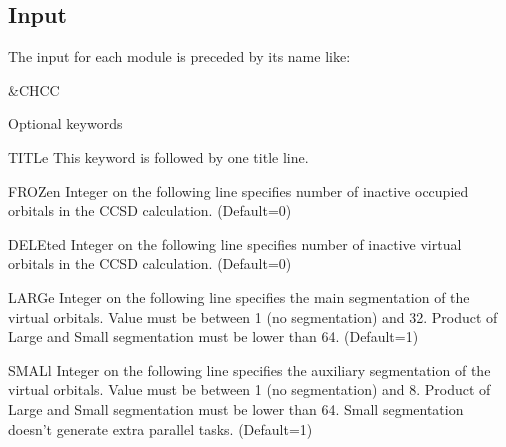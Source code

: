 \subsection{Input}
\label{sec:chcc_input}

The input for each module is preceded by its name like:
\begin{inputlisting}
 &CHCC
\end{inputlisting}
Optional keywords
\begin{keywordlist}
\item[TITLe]
This keyword is followed by one title line.
\item[FROZen]
Integer on the following line specifies number of inactive occupied
orbitals in the CCSD calculation. (Default=0)
\item[DELEted]
Integer on the following line specifies number of inactive virtual
orbitals in the CCSD calculation. (Default=0)
\item[LARGe]
Integer on the following line specifies the main segmentation of the virtual orbitals.
Value must be between 1 (no segmentation) and 32. Product of Large and Small segmentation
must be lower than 64. (Default=1)
\item[SMALl]
Integer on the following line specifies the auxiliary segmentation of the virtual orbitals.
Value must be between 1 (no segmentation) and 8. Product of Large and Small segmentation
must be lower than 64. Small segmentation doesn't generate extra parallel tasks.
(Default=1)

\end{keywordlist}
